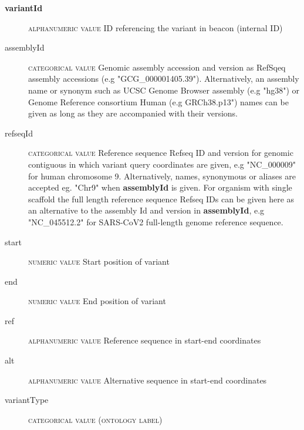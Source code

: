 \documentclass[a4paper, 10pt]{article}        %
\begin{document}
\begin{description}
	\item[\textbf{variantId}] {\textsc{alphanumeric value}} ID referencing the variant in beacon (internal ID)
	\item[assemblyId] {\textsc{categorical value}} Genomic assembly accession and version as RefSqeq assembly accessions (e.g "GCG\_000001405.39"). Alternatively, an assembly name or synonym such as UCSC Genome Browser assembly (e.g "hg38") or Genome Reference consortium Human (e.g GRCh38.p13") names can be given as long as they are accompanied with their versions. 
 	\item[refseqId] {\textsc{categorical value}} Reference sequence Refseq ID and version for genomic contiguous in which variant query coordinates are given, e.g "NC\_000009" for human chromosome 9. Alternatively, names, synonymous or aliases are accepted eg. "Chr9" when \textbf{assemblyId} is given. For organism with single scaffold the full length reference sequence Refseq IDs can be given here as an alternative to the assembly Id and version in \textbf{assemblyId}, e.g "NC\_045512.2" for SARS-CoV2 full-length genome reference sequence. 
	\item[start] {\textsc{numeric value}} Start position of variant
	\item[end] {\textsc{numeric value}} End position of variant %
	\item[ref] {\textsc{alphanumeric value}} Reference sequence in start-end coordinates
	\item[alt] {\textsc{alphanumeric value}} Alternative sequence in start-end coordinates
	\item[variantType] {\textsc{categorical value (ontology label)}}
 \end{description}
 
\end{document}
